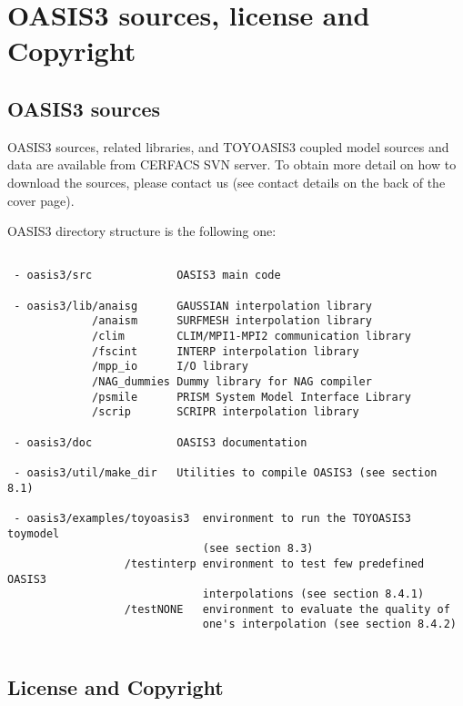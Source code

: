 \newpage
\chapter{OASIS3 sources, license and Copyright}
\label{sec_Obtaining}
%
\section{OASIS3 sources}
OASIS3 sources, related libraries, and TOYOASIS3
coupled model sources and data are available from CERFACS SVN server. To obtain more detail on how to download
the sources, please
contact us (see contact details on the back of the cover page).

OASIS3 directory structure is the following one:

\begin{verbatim}

 - oasis3/src             OASIS3 main code
 
 - oasis3/lib/anaisg      GAUSSIAN interpolation library
             /anaism      SURFMESH interpolation library
             /clim        CLIM/MPI1-MPI2 communication library
             /fscint      INTERP interpolation library  
             /mpp_io      I/O library
             /NAG_dummies Dummy library for NAG compiler
             /psmile      PRISM System Model Interface Library
             /scrip       SCRIPR interpolation library
                  
 - oasis3/doc             OASIS3 documentation
 
 - oasis3/util/make_dir   Utilities to compile OASIS3 (see section 8.1) 

 - oasis3/examples/toyoasis3  environment to run the TOYOASIS3 toymodel
                              (see section 8.3)
                  /testinterp environment to test few predefined OASIS3
                              interpolations (see section 8.4.1)
                  /testNONE   environment to evaluate the quality of 
                              one's interpolation (see section 8.4.2)    
 
\end{verbatim}
%                              
% 
%

\section{License and Copyright}

